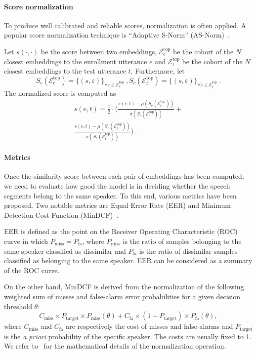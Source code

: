 \documentclass[conference]{IEEEtran}
\begin{document}
\paragraph{Score normalization}To produce well calibrated and reliable scores, normalization is often applied. A popular score normalization technique is ``Adaptive S-Norm'' (AS-Norm)~\cite{matejka2017asnorm}.

Let $s(\cdot,\cdot)$ be the score between two embeddings, $\mathcal{E}^{\text{top}}_e$ be the cohort of the $N$ closest embeddings to the enrollment utterance $e$ and $\mathcal{E}^{\text{top}}_t$ be the cohort of the $N$ closest embeddings to the test utterance $t$. Furthermore, let 
\begin{equation}
    S_e(\mathcal{E}^{\text{top}}_e) = \{(s,\varepsilon)\}_{\forall\varepsilon \in \mathcal{E}^{\text{top}}_e}~,
    S_e(\mathcal{E}^{\text{top}}_t) = \{(s,\varepsilon)\}_{\forall\varepsilon \in \mathcal{E}^{\text{top}}_t}~. 
\end{equation}
The normalized score is computed as
\begin{multline}
    s(e,t) = \frac{1}{2} \cdot \Bigg(\frac{s(e,t) - \mu(S_e(\mathcal{E}^{\text{top}}_e))}{\sigma(S_e(\mathcal{E}^{\text{top}}_e))} + \\
    \frac{s(e,t) - \mu(S_e(\mathcal{E}^{\text{top}}_t))}{\sigma(S_e(\mathcal{E}^{\text{top}}_t))}\Bigg)
    ~.
\end{multline}

\paragraph{Metrics}Once the similarity score between each pair of embeddings has been computed, we need to evaluate how good the model is in deciding whether the speech segments belong to the same speaker. To this end, various metrics have been proposed. Two notable metrics are Equal Error Rate (EER) and Minimum Detection Cost Function (MinDCF)~\cite{brummer2013bosaris,nist2018}. 

EER is defined as the point on the Receiver Operating Characteristic (ROC) curve in which $P_{\text{miss}} = P_{\text{fa}}$, where $P_{\text{miss}}$ is the ratio of samples belonging to the same speaker classified as dissimilar and $P_{\text{fa}}$ is the ratio of dissimilar samples classified as belonging to the same speaker. EER can be considered as a summary of the ROC curve.

On the other hand, MinDCF is derived from the normalization of the following weighted sum of misses and false-alarm error probabilities for a given decision threshold $\theta$:
\begin{equation}
    C_{\text{miss}} \times P_{\text{target}} \times P_{\text{miss}}(\theta) +
    C_{\text{fa}} \times (1 - P_{\text{target}}) \times P_{\text{fa}}(\theta) ,
\end{equation}
where $C_{\text{miss}}$ and $C_{\text{fa}}$ are respectively the cost of misses and false-alarms and $P_{\text{target}}$ is the \textit{a priori} probability of the specific speaker. The costs are usually fixed to 1. We refer to~\cite{nist2018} for the mathematical details of the normalization operation.
\end{document}
